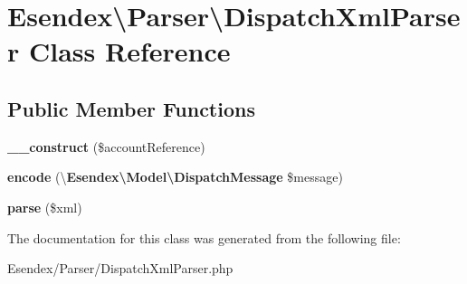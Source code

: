 \section{Esendex\textbackslash{}Parser\textbackslash{}Dispatch\-Xml\-Parser Class Reference}
\label{class_esendex_1_1_parser_1_1_dispatch_xml_parser}
\subsection*{Public Member Functions}
\begin{DoxyCompactItemize}
\item 
{\bfseries \-\_\-\-\_\-construct} (\$account\-Reference)\label{class_esendex_1_1_parser_1_1_dispatch_xml_parser_ae57358ee5671db5446793ba01644e72e}

\item 
{\bfseries encode} (\textbackslash{}{\bf Esendex\textbackslash{}\-Model\textbackslash{}\-Dispatch\-Message} \$message)\label{class_esendex_1_1_parser_1_1_dispatch_xml_parser_a90a0c3e4045ab19e732209b172691585}

\item 
{\bfseries parse} (\$xml)\label{class_esendex_1_1_parser_1_1_dispatch_xml_parser_af7e0d660489c79b6d8002abc0715857a}

\end{DoxyCompactItemize}


The documentation for this class was generated from the following file\-:\begin{DoxyCompactItemize}
\item 
Esendex/\-Parser/Dispatch\-Xml\-Parser.\-php\end{DoxyCompactItemize}
